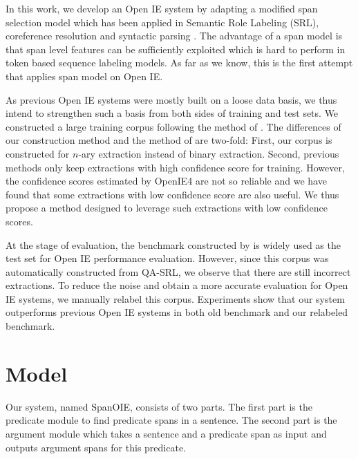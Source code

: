\documentclass[letterpaper]{article} %
\begin{document}
In this work, we develop an Open IE system by adapting a modified span selection model which has been applied in Semantic Role Labeling (SRL)\cite{Ouchi2018ASS,he-etal-2018-syntax,Li2019DependencyOS,Zhao2013IntegrativeSD,zhao-etal-2009-semantic,li-etal-2018-unified,cai2018full}, coreference resolution\cite{shou-zhao-2012-system,zhang-etal-2012-chinese} and syntactic parsing \cite{zhang-etal-2016-probabilistic,ma-zhao-2012-fourth,Li2020GlobalGreedy,zhou-zhao-2019-head,zhao-etal-2009-cross,li-etal-2018-seq2seq}. The advantage of a span model is that span level features can be sufficiently exploited which is hard to perform in token based sequence labeling models. As far as we know, this is the first attempt that applies span model on Open IE. 

As previous Open IE systems were mostly built on a loose data basis, we thus intend to strengthen such a basis from both sides of training and test sets. We constructed a large training corpus following the method of \cite{Cui2018NeuralOI}. The differences of our construction method and the method of \cite{Cui2018NeuralOI} are two-fold: First, our corpus is constructed for $n$-ary extraction instead of binary extraction. Second, previous methods only keep extractions with high confidence score for training. However, the confidence scores estimated by OpenIE4 are not so reliable and we have found that some extractions with low confidence score are also useful. We thus propose a method designed to leverage such extractions with low confidence scores.

At the stage of evaluation, the benchmark constructed by \cite{Stanovsky2016CreatingAL} is widely used as the test set for Open IE performance evaluation. However, since this corpus was automatically constructed from QA-SRL, we observe that there are still incorrect extractions. To reduce the noise and obtain a more accurate evaluation for Open IE systems, we manually relabel this corpus. Experiments show that our system outperforms previous Open IE systems in both old benchmark and our relabeled benchmark. 

\section{Model}
Our system, named SpanOIE, consists of two parts. The first part is the predicate module to find predicate spans in a sentence. The second part is the argument module which takes a sentence and a predicate span as input and outputs argument spans for this predicate. 
\end{document}
